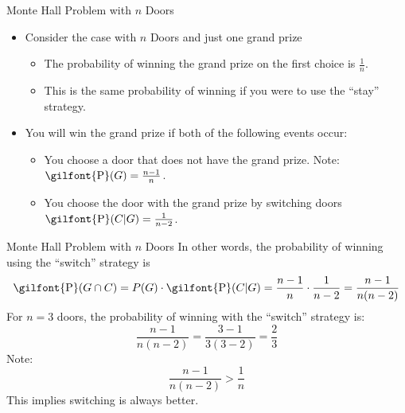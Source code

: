 \documentclass[
  ignorenonframetext,
]{beamer}
\providecommand{\tightlist}{%
  \setlength{\itemsep}{0pt}\setlength{\parskip}{0pt}}
\begin{document}
\begin{frame}{Monte Hall Problem with \(n\) Doors}
\protect\hypertarget{monte-hall-problem-with-n-doors}{}
\begin{itemize}
\item
  Consider the case with \(n\) Doors and just one grand prize

  \begin{itemize}
  \tightlist
  \item
    The probability of winning the grand prize on the first choice is
    \(\frac{1}{n}\).
  \item
    This is the same probability of winning if you were to use the
    ``stay'' strategy.
  \end{itemize}
\item
  You will win the grand prize if both of the following events occur:

  \begin{itemize}
  \tightlist
  \item
    You choose a door that does not have the grand prize. Note:
    \(\textrm{\gilfont{P}}\normalfont (G)=\frac{n-1}{n}\).
  \item
    You choose the door with the grand prize by switching doors
    \(\textrm{\gilfont{P}}\normalfont (C|G)=\frac{1}{n-2}\).
  \end{itemize}
\end{itemize}
\end{frame}

\begin{frame}{Monte Hall Problem with \(n\) Doors}
\protect\hypertarget{monte-hall-problem-with-n-doors-1}{}
In other words, the probability of winning using the ``switch'' strategy
is
\[\textrm{\gilfont{P}}\normalfont (G \cap C)=P(G)\cdot \textrm{\gilfont{P}}\normalfont (C|G)=\frac{n-1}{n}\cdot \frac{1}{n-2}=\frac{n-1}{n(n-2)}\]
For \(n=3\) doors, the probability of winning with the ``switch''
strategy is: \[\frac{n-1}{n(n-2)}=\frac{3-1}{3(3-2)}=\frac{2}{3}\] Note:
\[\frac{n-1}{n(n-2)}> \frac{1}{n}\] This implies switching is always
better.
\end{frame}
\end{document}

